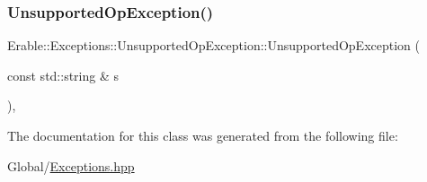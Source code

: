 \subsubsection{\texorpdfstring{UnsupportedOpException()}{UnsupportedOpException()}}
{\footnotesize\ttfamily Erable\+::\+Exceptions\+::\+Unsupported\+Op\+Exception\+::\+Unsupported\+Op\+Exception (\begin{DoxyParamCaption}\item[{const std\+::string \&}]{s }\end{DoxyParamCaption})\hspace{0.3cm}{\ttfamily [inline]}, {\ttfamily [explicit]}}



The documentation for this class was generated from the following file\+:\begin{DoxyCompactItemize}
\item 
Global/\mbox{\hyperlink{_exceptions_8hpp}{Exceptions.\+hpp}}\end{DoxyCompactItemize}
